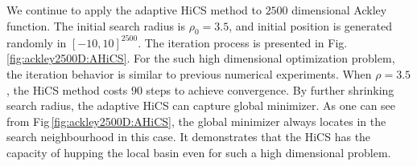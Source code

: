 \documentclass[final,1p,times]{elsarticle}
\begin{document}
%
We continue to apply the adaptive HiCS method to $2500$ dimensional
Ackley function. The initial search radius is $\rho_0=3.5$, and
initial position is generated randomly in $[-10,10]^{2500}$. 
The iteration process is presented in Fig.\,\ref{fig:ackley2500D:AHiCS}. 
For the such high dimensional optimization problem, the iteration
behavior is similar to previous numerical experiments. 
When $\rho=3.5$, the HiCS method costs $90$ steps to achieve convergence.
By further shrinking search radius, the adaptive HiCS can
capture global minimizer. As one can see from 
Fig\,\ref{fig:ackley2500D:AHiCS}, the global minimizer always
locates in the search neighbourhood in this case. 
It demonstrates that the HiCS has the capacity of hupping the
local basin even for such a high dimensional problem.
\end{document}
